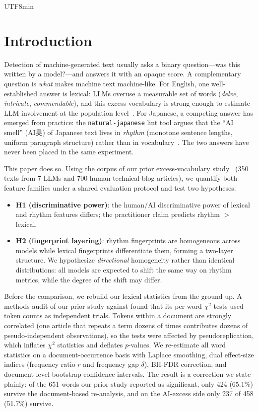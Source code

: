 \documentclass[11pt,a4paper]{article}
\begin{document}
\begin{CJK}{UTF8}{min}
\section{Introduction}

Detection of machine-generated text usually asks a binary question---was this written by a model?---and answers it with an opaque score. A complementary question is \emph{what} makes machine text machine-like. For English, one well-established answer is lexical: LLMs overuse a measurable set of words (\textit{delve}, \textit{intricate}, \textit{commendable}), and this excess vocabulary is strong enough to estimate LLM involvement at the population level~\citep{kobak2025excess, liang2024monitoring, juzek2025delve}. For Japanese, a competing answer has emerged from practice: the \texttt{natural-japanese} lint tool argues that the ``AI smell'' (AI臭) of Japanese text lives in \emph{rhythm} (monotone sentence lengths, uniform paragraph structure) rather than in vocabulary~\citep{mizoguchi2026natural}. The two answers have never been placed in the same experiment.

This paper does so. Using the corpus of our prior excess-vocabulary study~\citep{imoto2026excess} (350 texts from 7 LLMs and 700 human technical-blog articles), we quantify both feature families under a shared evaluation protocol and test two hypotheses:

\begin{itemize}
    \item \textbf{H1 (discriminative power)}: the human/AI discriminative power of lexical and rhythm features differs; the practitioner claim predicts rhythm $>$ lexical.
    \item \textbf{H2 (fingerprint layering)}: rhythm fingerprints are homogeneous across models while lexical fingerprints differentiate them, forming a two-layer structure. We hypothesize \emph{directional} homogeneity rather than identical distributions: all models are expected to shift the same way on rhythm metrics, while the degree of the shift may differ.
\end{itemize}

Before the comparison, we rebuild our lexical statistics from the ground up. A methods audit of our prior study against \citet{kobak2025excess} found that its per-word $\chi^2$ tests used token counts as independent trials. Tokens within a document are strongly correlated (one article that repeats a term dozens of times contributes dozens of pseudo-independent observations), so the tests were affected by pseudoreplication, which inflates $\chi^2$ statistics and deflates $p$-values. We re-estimate all word statistics on a document-occurrence basis with Laplace smoothing, dual effect-size indices (frequency ratio $r$ and frequency gap $\delta$), BH-FDR correction, and document-level bootstrap confidence intervals. The result is a correction we state plainly: of the 651 words our prior study reported as significant, only 424 (65.1\%) survive the document-based re-analysis, and on the AI-excess side only 237 of 458 (51.7\%) survive.


\end{CJK}
\end{document}
